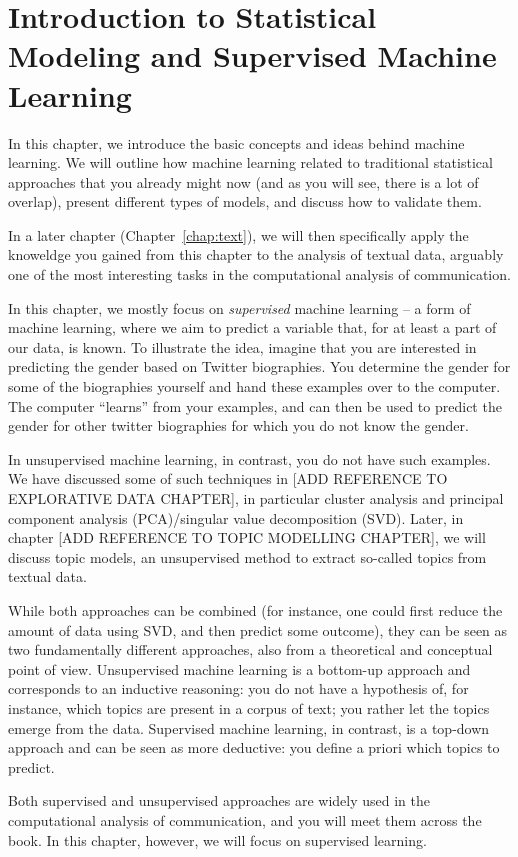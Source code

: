 \chapter{Introduction to Statistical Modeling and Supervised Machine Learning}

In this chapter, we introduce the basic concepts and ideas behind machine learning.
We will outline how machine learning related to traditional statistical approaches that you already might now (and as you will see, there is a lot of overlap), present different types of models, and discuss how to validate them.

In a later chapter (Chapter~\ref{chap:text}), we will then specifically apply the knoweldge you gained from this chapter to the analysis of textual data, arguably one of the most interesting tasks in the computational analysis of communication.

In this chapter, we mostly focus on \emph{supervised} machine learning -- a form of machine learning, where we aim to predict a variable that, for at least a part of our data, is known. To illustrate the idea, imagine that you are interested in predicting the gender based on Twitter biographies. You determine the gender for some of the biographies yourself and hand these examples over to the computer. The computer ``learns'' from your examples, and can then be used to predict the gender for other twitter biographies for which you do not know the gender.

In unsupervised machine learning, in contrast, you do not have such examples. We have discussed some of such techniques in [ADD REFERENCE TO EXPLORATIVE DATA CHAPTER], in particular cluster analysis and principal component analysis (PCA)/singular value decomposition (SVD).
Later, in chapter [ADD REFERENCE TO TOPIC MODELLING CHAPTER], we will discuss topic models, an unsupervised method to extract so-called topics from textual data.

While both approaches can be combined (for instance, one could first reduce the amount of data using SVD, and then predict some outcome), they can be seen as two fundamentally different approaches, also from a theoretical and conceptual point of view.
Unsupervised machine learning is a bottom-up approach and corresponds to an inductive reasoning: you do not have a hypothesis of, for instance, which topics are present in a corpus of text; you rather let the topics emerge from the data.
Supervised machine learning, in contrast, is a top-down approach and can be seen as more deductive: you define a priori which topics to predict.

Both supervised and unsupervised approaches are widely used in the computational analysis of communication, and you will meet them across the book.
In this chapter, however, we will focus on supervised learning.








